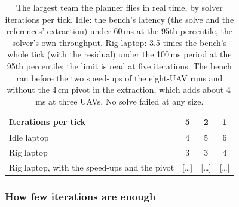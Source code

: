 \begin{table}[htbp]
\centering
\footnotesize
\caption[The real-time limit]{The largest team the planner flies in real time, by solver iterations per tick. Idle:
the bench's latency (the solve and the references' extraction) under 60\,ms at the 95th percentile, the solver's own
throughput. Rig laptop: 3.5 times the bench's whole tick (with the residual) under the 100\,ms period at the 95th
percentile; the limit is read at five iterations. The bench ran before the two speed-ups of the eight-UAV runs and
without the 4\,cm pivot in the extraction, which adds about 4\,ms at three UAVs. No solve failed at any size.}
\label{tab:scale_nmax}
\begin{tabular}{lccc}
\toprule
Iterations per tick & 5 & 2 & 1 \\
\midrule
Idle laptop & 4 & 5 & 6 \\
Rig laptop & 3 & 3 & 4 \\
\addlinespace
Rig laptop, with the speed-ups and the pivot & [\dots] & [\dots] & [\dots] \\
\bottomrule
\end{tabular}
\end{table}


\subsubsection{How few iterations are enough}


